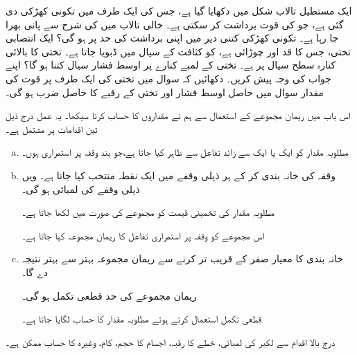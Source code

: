 ایک مستطیل تالاب شکل  میں دکھایا گیا ہے،  جس کی ایک طرف میں تکونی کھڑکی دی گئی ہے،  جو  کی قوت برداشت کر سکتی ہے۔  خالی تالاب میں   کی شرح سے پانی بھرا جا رہا ہے۔ تکونی کھڑکی کتنی دیر میں اپنی برداشت کی  حد پر ہو گی؟
ایک انتصابی تختی، جس کا قد  اور چوڑائی  ہے،  کو کثافت  کے سیال میں ڈبویا جاتا ہے۔ تختی کا بالائی کنارہ سطح سیال پر ہے۔ تختی  کے لمبے کنارے پر اوسط فشار سیال کتنا ہو گا؟ اپنے جواب کی وجہ پیش کریں۔ 
دکھائیں کہ سوال  میں تختی کی ایک طرف پر قوت کی مقدار سوال  میں حاصل اوسط فشار  اور  تختی کے رقبے کا حاصل ضرب ہو گی۔




اس باب میں ریمان مجموعے  کے استعمال سے ہم نے  مقداروں کا حساب کرنا سیکھا۔ یہ عمل درج ذیل تین اقدامات  پر مشتمل ہے۔
\begin{enumerate}[a.]
\item
مطلوبہ مقدار  کو ایک یا ایک سے زائد تفاعل سے ظاہر کیا جاتا ہے،جو بند وقفہ  پر استمراری ہوں۔
\item
وقفہ  کی خانہ بندی کر کے ہر ذیلی وقفے  میں ایک نقطہ  منتخب کیا جاتا ہے۔  ویں ذیلی وقفے کی لمبائی   ہو گی۔ 

مطلوبہ  مقدار  کی تخمینی قیمت کو مجموعے  کی صورت میں لکھا جاتا ہے۔

اس مجموعے کو وقفہ  پر استمراری تفاعل کا ریمان مجموعہ کہا جاتا ہے۔
\item
خانہ بندی کا معیار صفر کے قریب تر کرنے سے ریمان مجموعہ بہتر سے بہتر نتیجہ دے گا۔

ریمان مجموعے  کی حد قطعی تکمل ہو گی۔

قطعی تکمل استعمال کرتے ہوئے  مطلوبہ مقدار  کا حساب لگایا جاتا ہے۔
\end{enumerate}

درج بالا اقدام سے لکیر کی لمبائی، خطے کا رقبہ، اجسام کا حجم، کام، وغیرہ کا حساب ممکن ہے۔

